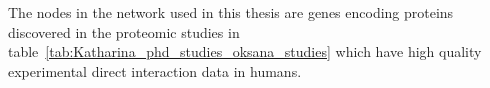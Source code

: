 The nodes in the network used in this thesis are genes encoding proteins discovered in the proteomic studies in table~\ref{tab:Katharina_phd_studies_oksana_studies} which have high quality experimental direct interaction data in humans. 
 










